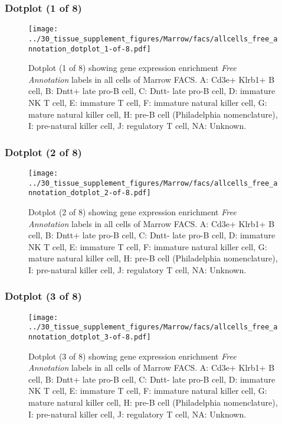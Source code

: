 \clearpage

\subsubsection{Dotplot (1 of 8)}
\begin{figure}[h]
\centering
\texttt{[image: ../30\_tissue\_supplement\_figures/Marrow/facs/allcells\_free\_annotation\_dotplot\_1-of-8.pdf]}

\caption{ Dotplot (1 of 8)  showing gene expression enrichment \emph{Free Annotation} labels in all cells of Marrow FACS. A: Cd3e+ Klrb1+ B cell, B: Dntt+ late pro-B cell, C: Dntt- late pro-B cell, D: immature NK T cell, E: immature T cell, F: immature natural killer cell, G: mature natural killer cell, H: pre-B cell (Philadelphia nomenclature), I: pre-natural killer cell, J: regulatory T cell, NA: Unknown.}
\end{figure}


\clearpage

\subsubsection{Dotplot (2 of 8)}
\begin{figure}[h]
\centering
\texttt{[image: ../30\_tissue\_supplement\_figures/Marrow/facs/allcells\_free\_annotation\_dotplot\_2-of-8.pdf]}

\caption{ Dotplot (2 of 8)  showing gene expression enrichment \emph{Free Annotation} labels in all cells of Marrow FACS. A: Cd3e+ Klrb1+ B cell, B: Dntt+ late pro-B cell, C: Dntt- late pro-B cell, D: immature NK T cell, E: immature T cell, F: immature natural killer cell, G: mature natural killer cell, H: pre-B cell (Philadelphia nomenclature), I: pre-natural killer cell, J: regulatory T cell, NA: Unknown.}
\end{figure}


\clearpage

\subsubsection{Dotplot (3 of 8)}
\begin{figure}[h]
\centering
\texttt{[image: ../30\_tissue\_supplement\_figures/Marrow/facs/allcells\_free\_annotation\_dotplot\_3-of-8.pdf]}

\caption{ Dotplot (3 of 8)  showing gene expression enrichment \emph{Free Annotation} labels in all cells of Marrow FACS. A: Cd3e+ Klrb1+ B cell, B: Dntt+ late pro-B cell, C: Dntt- late pro-B cell, D: immature NK T cell, E: immature T cell, F: immature natural killer cell, G: mature natural killer cell, H: pre-B cell (Philadelphia nomenclature), I: pre-natural killer cell, J: regulatory T cell, NA: Unknown.}
\end{figure}



